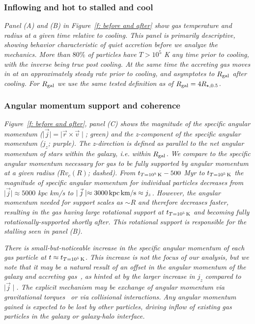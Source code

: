 \documentclass[fleqn,usenatbib]{mnras}
\newcommand{\tcon}{t_{T=10^5\,{\rm K}}}
\begin{document}
\subsubsection{Inflowing and hot to stalled and cool}
\label{s: mechanics -- temp and radius}

\textit{
Panel (A) and (B) in Figure~\ref{f: before and after} show gas temperature and radius at a given time relative to cooling.
This panel is primarily descriptive, showing behavior characteristic of quiet accretion before we analyze the mechanics.
More than $80\%$ of particles have $T > 10^5$ K any time prior to cooling, with the inverse being true post cooling.
At the same time the accreting gas moves in at an approximately steady rate prior to cooling, and asymptotes to $R_{\rm gal}$ after cooling.
For $R_{\rm gal}$ we use the same tested definition as \cite{Hafen2019, Hafen2020} of $R_{\rm gal} = 4 R_{\star,0.5}$.
}

\subsubsection{Angular momentum support and coherence}
\label{s: mechanics -- angular momentum}

\textit{
Figure~\ref{f: before and after}, panel (C) shows the magnitude of the specific angular momentum ($\mid \vec j \mid = \mid \vec r \times \vec v \mid$; green) and the z-component of the specific angular momentum ($j_z$; purple).
The z-direction is defined as parallel to the net angular momentum of stars within the galaxy, i.e. within $R_{\rm gal}$.
We compare to the specific angular momentum necessary for gas to be fully supported by angular momentum at a given radius ($Rv_c(R)$; dashed).
From $\tcon - 500$ Myr to $\tcon$ the magnitude of specific angular momentum for individual particles decreases from $\mid \vec j \mid \approx 5000$ kpc km/s to $\mid \vec j \mid \approx 3000\,{\rm kpc\,km/s} \approx j_z$.
However, the angular momentum needed for support scales as $\sim R$ and therefore decreases faster, resulting in the gas having large rotational support at $\tcon$ and becoming fully rotationally-supported shortly after.
This rotational support is responsible for the stalling seen in panel (B).
}

\textit{
There is small-but-noticeable increase in the specific angular momentum of each gas particle at $t \approx \tcon$.
This increase is not the focus of our analysis, but we note that it may be a natural result of an offset in the angular momentum of the galaxy and accreting gas~\citep[e.g.][]{Danovich2012, DeFelippis2017, DeFelippis2020}, as hinted at by the larger increase in $j_z$ compared to $\mid \vec j \mid$.
The explicit mechanism may be exchange of angular momentum via gravitational torques~\citep[e.g.][]{Danovich2015} or via collisional interactions.
Any angular momentum gained is expected to be lost by other particles, driving inflow of existing gas particles in the galaxy or galaxy-halo interface.
}
\end{document}
